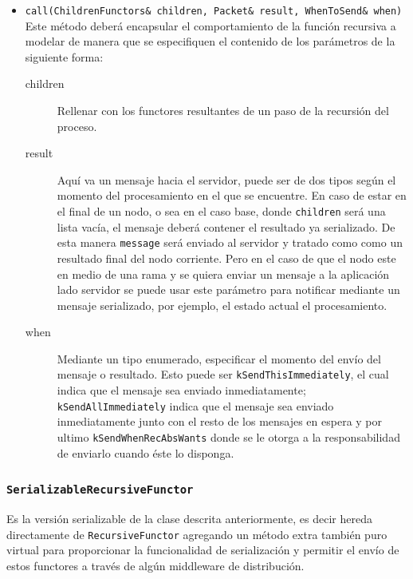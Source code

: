     \begin{itemize}
        \item \texttt{call(ChildrenFunctors\& children, Packet\& result, WhenToSend\& when)}
               Este método deberá encapsular el comportamiento de la función recursiva a modelar de manera que se
               especifiquen el contenido de los parámetros de la siguiente forma:
        \begin{description}
            \item[children] Rellenar con los functores resultantes de un paso de la recursión del proceso.
            \item[result]   Aquí va un mensaje hacia el servidor, puede ser de dos tipos según el momento del
                            procesamiento en el que se encuentre. En caso de estar en el final de un nodo, o sea en
                            el caso base, donde \texttt{children} será una lista vacía, el mensaje deberá contener el
                            resultado ya serializado. De esta manera \texttt{message} será enviado al servidor y
                            tratado como como un resultado final del nodo corriente. Pero en el caso de que el nodo este
                            en medio de una rama y se quiera enviar un mensaje a la aplicación lado servidor se
                            puede usar este parámetro para notificar mediante un mensaje serializado, por ejemplo,
                            el estado actual el procesamiento.
            \item[when] Mediante un tipo enumerado, especificar el momento del envío del mensaje o resultado. Esto
                        puede ser \texttt{kSendThisImmediately}, el cual indica que el mensaje sea enviado
                        inmediatamente; \\ \texttt{kSendAllImmediately} indica que el mensaje sea enviado inmediatamente
                        junto con el resto de los mensajes en espera y por ultimo \texttt{kSendWhenRecAbsWants} donde se
                        le otorga a \rc{} la responsabilidad de enviarlo cuando éste lo disponga.
        \end{description}
    \end{itemize}

    \subsubsection{\texttt{SerializableRecursiveFunctor}}

        Es la versión serializable de la clase descrita anteriormente, es decir hereda directamente de
        \texttt{RecursiveFunctor} agregando un método extra también puro virtual para proporcionar la
        funcionalidad de serialización y permitir el envío de estos functores a través de algún middleware de
        distribución.

